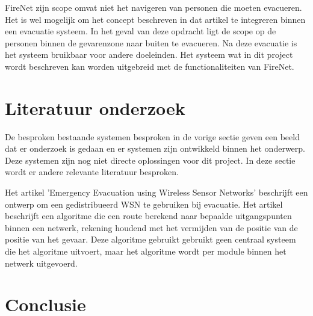 FireNet zijn scope omvat niet het navigeren van personen die moeten evacueren. Het is wel mogelijk om het concept beschreven in dat artikel te integreren binnen een evacuatie systeem. In het geval van deze opdracht ligt de scope op de personen binnen de gevarenzone naar buiten te evacueren. Na deze evacuatie is het systeem bruikbaar voor andere doeleinden. Het systeem wat in dit project wordt beschreven kan worden uitgebreid met de functionaliteiten van FireNet.

\section{Literatuur onderzoek}
De besproken bestaande systemen besproken in de vorige sectie geven een beeld dat er onderzoek is gedaan en er systemen zijn ontwikkeld binnen het onderwerp. Deze systemen zijn nog niet directe oplossingen voor dit project. In deze sectie wordt er andere relevante literatuur besproken.



Het artikel 'Emergency Evacuation using Wireless Sensor Networks'\cite{BarnesEmEv} beschrijft een ontwerp om een gedistribueerd WSN te gebruiken bij evacuatie. Het artikel beschrijft een algoritme die een route berekend naar bepaalde uitgangspunten binnen een netwerk, rekening houdend met het vermijden van de positie van de positie van het gevaar. Deze algoritme gebruikt gebruikt geen centraal systeem die het algoritme uitvoert, maar het algoritme wordt per module binnen het netwerk uitgevoerd. 

\section{Conclusie}


